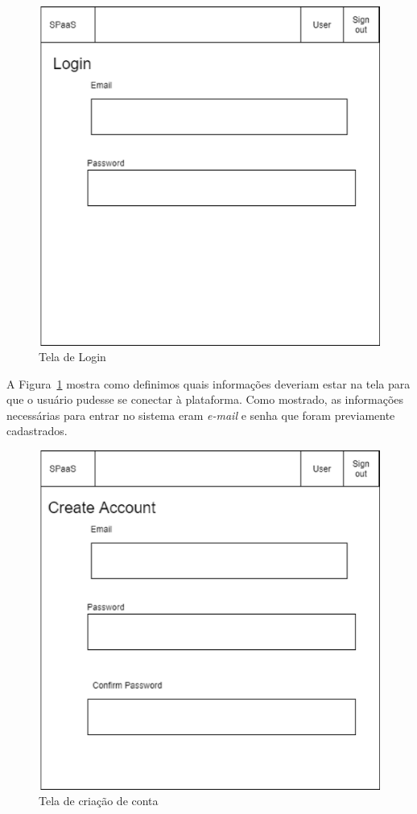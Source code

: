 \documentclass[11pt,twoside]{article}
\begin{document}
\begin{figure}[!h]
  \centering
  \includegraphics[scale=0.4]{login.eps}
  \caption{Tela de Login}
  \label{fig:loginScreen}
\end{figure}

A Figura~\ref{fig:loginScreen} mostra como definimos quais informações deveriam estar na tela para que o usuário pudesse se conectar à plataforma. Como mostrado, 
as informações necessárias para entrar no sistema eram \emph{e-mail} e senha que foram previamente cadastrados.


\begin{figure}[!h]
  \centering
  \includegraphics[scale=0.4]{account_reg.eps}
  \caption{Tela de criação de conta}
  \label{fig:createScreen}
\end{figure}
\end{document}
